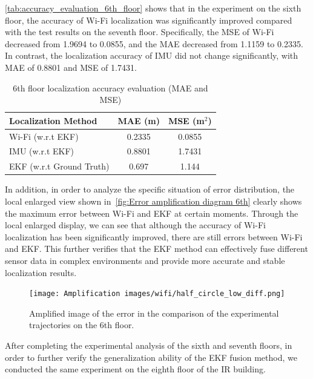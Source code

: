 \documentclass[12pt,a4paper]{article}
\numberwithin{equation}{section}
\begin{document}
\autoref{tab:accuracy_evaluation_6th_floor} shows that in the experiment on the
sixth floor, the accuracy of Wi-Fi localization was significantly improved
compared with the test results on the seventh floor. Specifically, the MSE of
Wi-Fi decreased from 1.9694 to 0.0855, and the MAE decreased from 1.1159 to
0.2335. In contrast, the localization accuracy of IMU did not change
significantly, with MAE of 0.8801 and MSE of 1.7431.
\begin{table}[htbp]
  \centering
  \caption{6th floor localization accuracy evaluation (MAE and MSE)}
  \label{tab:accuracy_evaluation_6th_floor} %
  \begin{tabular}{lcc}
    \toprule
    \textbf{Localization Method} & \textbf{MAE (m)} & \textbf{MSE (m$^2$)} \\
    \midrule

    Wi-Fi (w.r.t EKF)                       & 0.2335                             & 0.0855                             \\ 
    IMU (w.r.t EKF)                           & 0.8801                             & 1.7431                             \\ 
    EKF (w.r.t Ground Truth) & 0.697 & 1.144 \\
    \bottomrule
  \end{tabular}
\end{table}

In addition, in order to analyze the specific situation of error distribution,
the local enlarged view shown in~\autoref{fig:Error amplification diagram 6th}
clearly shows the maximum error between Wi-Fi and EKF at certain
moments. Through the local enlarged display, we can see that although the
accuracy of Wi-Fi localization has been significantly improved, there are still
errors between Wi-Fi and EKF. This further verifies that the EKF method can
effectively fuse different sensor data in complex environments and provide more
accurate and stable localization results.
\begin{figure}[H]
  \centering
  \texttt{[image: Amplification
    images/wifi/half\_circle\_low\_diff.png]}
  \caption{Amplified image of the error in the comparison of the experimental
    trajectories on the 6th floor.}
  \label{fig:Error amplification diagram 6th}
\end{figure}

After completing the experimental analysis of the sixth and seventh floors, in
order to further verify the generalization ability of the EKF fusion method, we
conducted the same experiment on the eighth floor of the IR building.
\end{document}
